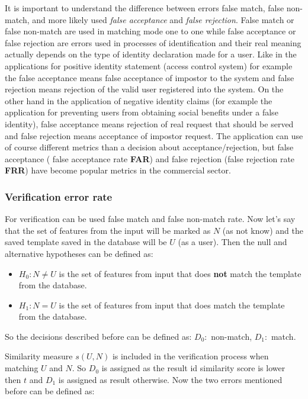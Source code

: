 It is important to understand the difference between errors false match, false non-match, and more likely used \emph{false acceptance} and \emph{false rejection}. False match or false non-match are used in matching mode one to one while false acceptance or false rejection are errors used in processes of identification and their real meaning actually depends on the type of identity declaration made for a user. Like in the applications for positive identity statement (access control system) for example the false acceptance means false acceptance of impostor to the system and false rejection means rejection of the valid user registered into the system. On the other hand in the application of negative identity claims (for example the application for preventing users from obtaining social benefits under a false identity), false acceptance means rejection of real request that should be served and false rejection means acceptance of impostor request. The application can use of course different metrics than a decision about acceptance/rejection, but false acceptance ( false acceptance rate \textbf{FAR}) and false rejection (false rejection rate \textbf{FRR}) have become popular metrics in the commercial sector.\cite{maltoni2009handbook}

\subsubsection{Verification error rate}
For verification can be used false match and false non-match rate. Now let's say that the set of features from the input will be marked as $N$ (as not know) and the saved template saved in the database will be $U$ (as a user). Then the null and alternative hypotheses can be defined as:\cite{maltoni2009handbook}

\begin{itemize}[label={}]
    \item $H_0: N \neq U$ is the set of features from input that does \textbf{not} match the template from the database.
    \item $H_1: N = U$ is the set of features from input that does match the template from the database.
\end{itemize}

So the decisions described before can be defined as: $D_0:$ non-match, $D_1:$ match.\cite{maltoni2009handbook}

Similarity measure $s(U, N)$ is included in the verification process when matching $U$ and $N$. So $D_0$ is assigned as the result id similarity score is lower then $t$ and $D_1$ is assigned as result otherwise. Now the two errors mentioned before can be defined as:\cite{maltoni2009handbook}

